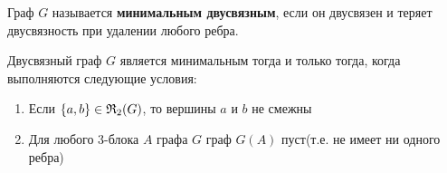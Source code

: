 \begin{df}
	Граф $G$ называется \textbf{минимальным двусвязным}, если он двусвязен и теряет двусвязность при удалении любого ребра.
\end{df}

\begin{thm}[Теорема 2.5] \label{theorem:2_5}
	Двусвязный граф $G$ является минимальным тогда и только тогда, когда выполняются следующие условия:

	\begin{enumerate}
		\item Если $\{ a, b \} \in \mathfrak{R}_2(G)$, то вершины  $a$ и  $b$ не смежны \label{cond:theorem_2_5_1}
		\item Для любого 3-блока $A$ графа $G$ граф $G(A)$ пуст(т.е. не имеет ни одного ребра) \label{cond:theorem_2_5_2}
	\end{enumerate}

\end{thm}

